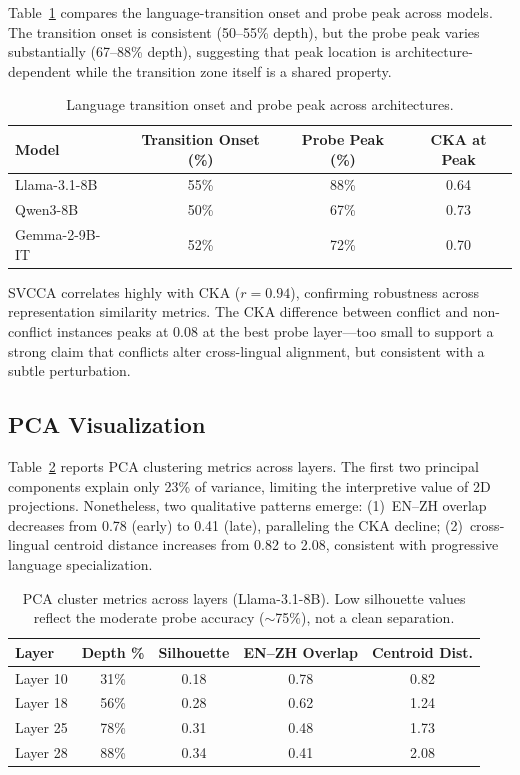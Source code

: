 \documentclass{article}
\begin{document}
Table~\ref{tab:transition} compares the language-transition onset and probe peak across models. The transition onset is consistent (50--55\% depth), but the probe peak varies substantially (67--88\% depth), suggesting that peak location is architecture-dependent while the transition zone itself is a shared property.

\begin{table}[t]
\centering
\caption{Language transition onset and probe peak across architectures.}
\label{tab:transition}
\begin{tabular}{lccc}
\toprule
Model & Transition Onset (\%) & Probe Peak (\%) & CKA at Peak \\
\midrule
Llama-3.1-8B & 55\% & 88\% & 0.64 \\
Qwen3-8B & 50\% & 67\% & 0.73 \\
Gemma-2-9B-IT & 52\% & 72\% & 0.70 \\
\bottomrule
\end{tabular}
\end{table}

SVCCA correlates highly with CKA ($r = 0.94$), confirming robustness across representation similarity metrics. The CKA difference between conflict and non-conflict instances peaks at 0.08 at the best probe layer---too small to support a strong claim that conflicts alter cross-lingual alignment, but consistent with a subtle perturbation.

\subsection{PCA Visualization}
\label{sec:pca}

Table~\ref{tab:pca} reports PCA clustering metrics across layers. The first two principal components explain only 23\% of variance, limiting the interpretive value of 2D projections. Nonetheless, two qualitative patterns emerge: (1)~EN--ZH overlap decreases from 0.78 (early) to 0.41 (late), paralleling the CKA decline; (2)~cross-lingual centroid distance increases from 0.82 to 2.08, consistent with progressive language specialization.

\begin{table}[t]
\centering
\caption{PCA cluster metrics across layers (Llama-3.1-8B). Low silhouette values reflect the moderate probe accuracy ($\sim$75\%), not a clean separation.}
\label{tab:pca}
\begin{tabular}{lcccc}
\toprule
Layer & Depth \% & Silhouette & EN--ZH Overlap & Centroid Dist. \\
\midrule
Layer 10 & 31\% & 0.18 & 0.78 & 0.82 \\
Layer 18 & 56\% & 0.28 & 0.62 & 1.24 \\
Layer 25 & 78\% & 0.31 & 0.48 & 1.73 \\
Layer 28 & 88\% & 0.34 & 0.41 & 2.08 \\
\bottomrule
\end{tabular}
\end{table}
\end{document}
